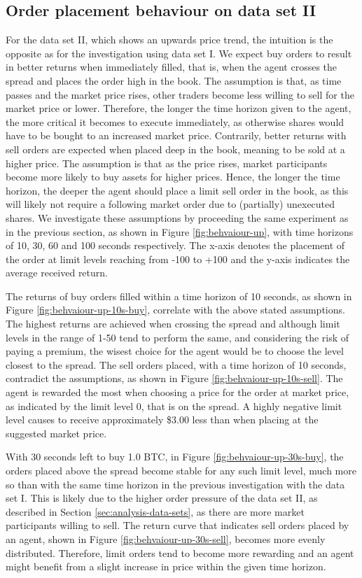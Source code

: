 \subsection{Order placement behaviour on data set II}
For the data set II, which shows an upwards price trend, the intuition is the opposite as for the investigation using data set I.
We expect buy orders to result in better returns when immediately filled, that is, when the agent crosses the spread and places the order high in the book.
The assumption is that, as time passes and the market price rises, other traders become less willing to sell for the market price or lower.
Therefore, the longer the time horizon given to the agent, the more critical it becomes to execute immediately, as otherwise shares would have to be bought to an increased market price.
Contrarily, better returns with sell orders are expected when placed deep in the book, meaning to be sold at a higher price.
The assumption is that as the price rises, market participants become more likely to buy assets for higher prices.
Hence, the longer the time horizon, the deeper the agent should place a limit sell order in the book, as this will likely not require a following market order due to (partially) unexecuted shares.
We investigate these assumptions by proceeding the same experiment as in the previous section, as shown in Figure \ref{fig:behvaiour-up}, with time horizons of 10, 30, 60 and 100 seconds respectively.
The x-axis denotes the placement of the order at limit levels reaching from -100 to +100 and the y-axis indicates the average received return.

The returns of buy orders filled within a time horizon of 10 seconds, as shown in Figure \ref{fig:behvaiour-up-10s-buy}, correlate with the above stated assumptions.
The highest returns are achieved when crossing the spread and although limit levels in the range of 1-50 tend to perform the same, and considering the risk of paying a premium, the wisest choice for the agent would be to choose the level closest to the spread.
The sell orders placed, with a time horizon of 10 seconds, contradict the assumptions, as shown in Figure \ref{fig:behvaiour-up-10s-sell}.
The agent is rewarded the most when choosing a price for the order at market price, as indicated by the limit level 0, that is on the spread.
A highly negative limit level causes to receive approximately \$3.00 less than when placing at the suggested market price.

With 30 seconds left to buy 1.0 BTC, in Figure \ref{fig:behvaiour-up-30s-buy}, the orders placed above the spread become stable for any such limit level, much more so than with the same time horizon in the previous investigation with the data set I.
This is likely due to the higher order pressure of the data set II, as described in Section \ref{sec:analysis-data-sets}, as there are more market participants willing to sell.
The return curve that indicates sell orders placed by an agent, shown in Figure \ref{fig:behvaiour-up-30s-sell}, becomes more evenly distributed.
Therefore, limit orders tend to become more rewarding and an agent might benefit from a slight increase in price within the given time horizon.

